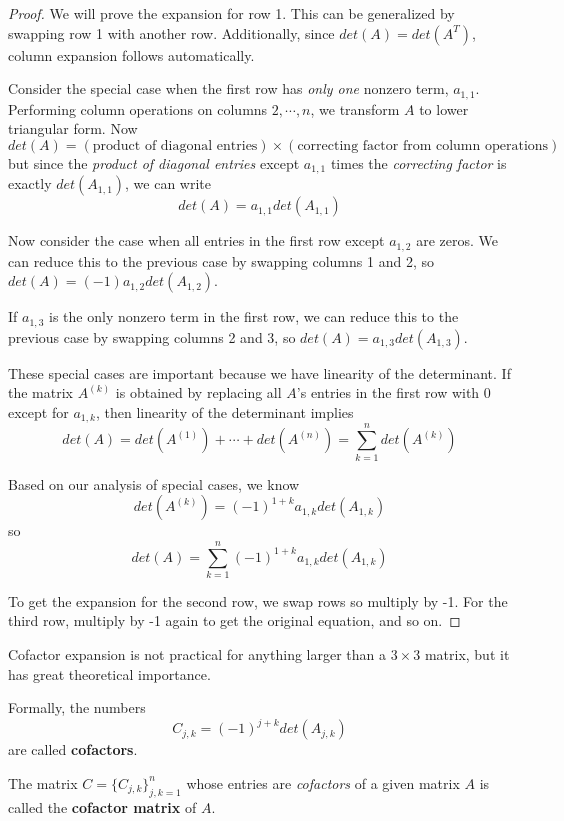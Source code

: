 \begin{proof}
We will prove the expansion for row 1. This can be generalized by swapping row 1 with another row. Additionally, since $det(A) = det(A^{T})$, column expansion follows automatically. 

Consider the special case when the first row has \textit{only one} nonzero term, $a_{1, 1}$. Performing column operations on columns $2, \cdots, n$, we transform $A$ to lower triangular form. Now
$$det(A) = (\text{product of diagonal entries}) \times (\text{correcting factor from column operations})$$
but since the \textit{product of diagonal entries} except $a_{1,1}$ times the \textit{correcting factor} is exactly $det(A_{1,1})$, we can write 
$$det(A) = a_{1,1} det(A_{1,1})$$

Now consider the case when all entries in the first row except $a_{1,2}$ are zeros. We can reduce this to the previous case by swapping columns 1 and 2, so $det(A) = (-1) a_{1,2} det(A_{1,2})$. 

If $a_{1,3}$ is the only nonzero term in the first row, we can reduce this to the previous case by swapping columns 2 and 3, so $det(A) = a_{1,3} det(A_{1,3})$. 

These special cases are important because we have linearity of the determinant. If the matrix $A^{(k)}$ is obtained by replacing all $A$'s entries in the first row with 0 except for $a_{1,k}$, then linearity of the determinant implies 
$$det(A) = det(A^{(1)}) + \cdots + det(A^{(n)}) = \sum_{k=1}^{n} det(A^{(k)})$$

Based on our analysis of special cases, we know 
$$det(A^{(k)}) = (-1)^{1 + k} a_{1, k} det(A_{1, k})$$ 
so 
$$det(A) = \sum_{k=1}^{n} (-1)^{1 + k} a_{1, k} det(A_{1,k})$$

To get the expansion for the second row, we swap rows so multiply by -1. For the third row, multiply by -1 again to get the original equation, and so on. 
\end{proof}

Cofactor expansion is not practical for anything larger than a $3 \times 3$ matrix, but it has great theoretical importance. 

\begin{definition}
Formally, the numbers 
$$C_{j, k}= (-1)^{j + k} det(A_{j,k})$$
are called \textbf{cofactors}.

The matrix $C = \{ C_{j, k}\}^{n}_{j, k = 1}$ whose entries are \textit{cofactors} of a given matrix $A$ is called the \textbf{cofactor matrix} of $A$. 
\end{definition}

